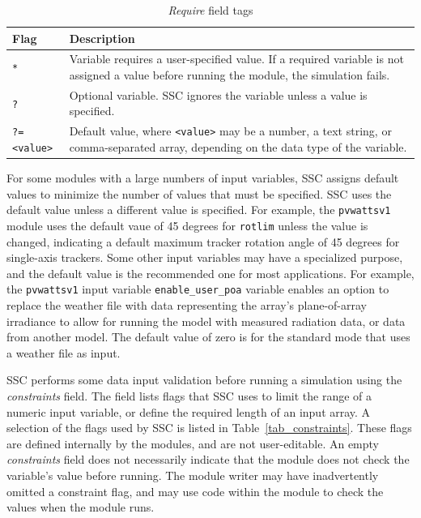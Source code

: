 \documentclass{article}
\begin{document}
\begin{table}[ht]
\begin{center}
\begin{tabular}{p{0.75in}p{4.75in}}
Flag & Description\\
\hline
\texttt{*} &  Variable requires a user-specified value. If a required variable is not assigned a value before running the module, the simulation fails.\\
\texttt{?} & Optional variable. SSC ignores the variable unless a value is specified.\\
\texttt{?=<value>} & Default value, where \texttt{<value>} may be a number, a text string, or comma-separated array, depending on the data type of the variable.\\
\end{tabular}
\caption{\emph{Require} field tags}
\label{tab_required}
\end{center}
\end{table}

For some modules with a large numbers of input variables, SSC assigns default values to minimize the number of values that must be specified. SSC uses the default value unless a different value is specified. For example, the \texttt{pvwattsv1} module uses the default vaue of 45 degrees for \texttt{rotlim} unless the value is changed, indicating a default maximum tracker rotation angle of 45 degrees for single-axis trackers. Some other input variables may have a specialized purpose, and the default value is the recommended one for most applications. For example, the \texttt{pvwattsv1} input variable \texttt{enable\_user\_poa} variable enables an option to replace the weather file with data representing the array's plane-of-array irradiance to allow for running the model with measured radiation data, or data from another model. The default value of zero is for the standard mode that uses a weather file as input.

SSC performs some data input validation before running a simulation using the \emph{constraints} field. The field lists flags that SSC uses to limit the range of a numeric input variable, or define the required length of an input array.  A selection of the flags used by SSC is listed in Table~\ref{tab_constraints}.  These flags are defined internally by the modules, and are not user-editable. An empty \emph{constraints} field does not necessarily indicate that the module does not check the variable's value before running. The module writer may have inadvertently omitted a constraint flag, and may use code within the module to check the values when the module runs.
\end{document}
